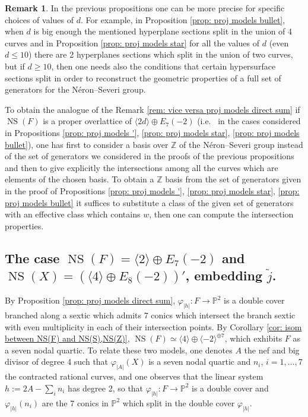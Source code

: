 \documentclass{amsart}
\theoremstyle{definition}
\newtheorem{rem}[thm]{Remark}
\numberwithin{equation}{section}
\numberwithin{equation}{section} \theoremstyle{definition}
\DeclareMathOperator{\NS}{NS}
\newcommand{\ra}{\rightarrow}
\newcommand\Z{\mathbb{Z}}
\begin{document}
\begin{rem}{\rm 
In the previous propositions one can be more precise for specific choices of values of $d$. For example, in Proposition \ref{prop: proj models bullet}, when $d$ is big enough the mentioned hyperplane sections split in the union of 4 curves and in Proposition \ref{prop: proj models star} for all the values of $d$ (even $d\leq 10$) there are 2 hyperplanes sections which split in the union of two curves, but if $d\geq 10$, then one needs also the conditions that certain hypersurface sections split in order to reconstruct the geometric properties of a full set of generators for the N\'eron--Severi group.

To obtain the analogue of the Remark \ref{rem: vice versa proj models direct sum} if $\NS(F)$ is a proper overlattice of $\langle 2d\rangle\oplus E_7(-2)$ (i.e.~ in the cases considered in Propositions \ref{prop: proj models '}, \ref{prop: proj models star}, \ref{prop: proj models bullet}), one has first to consider a basis over $\Z$ of the N\'eron--Severi group instead of the set of generators we considered in the proofs of the previous propositions and then to give explicitly the intersections among all the curves which are elements of the chosen basis. To obtain a $\Z$ basis from the set of generators given in the proof of Propositions \ref{prop: proj models '}, \ref{prop: proj models star}, \ref{prop: proj models bullet} it suffices to substitute a class of the given set of generators with an effective class which contains $w$, then one can compute the intersection properties.
}\end{rem}

\subsection{The case $\NS(F)=\langle 2\rangle\oplus E_7(-2)$ and $\NS(X)=(\langle 4\rangle\oplus E_8(-2))'$, embedding $\widetilde{j}$.}

By Proposition \ref{prop: proj models direct sum}, $\varphi_{|h|}:F\ra \mathbb{P}^2$ is a double cover branched along a sextic which admits 7 conics which intersect the branch sextic with even multiplicity in each of their intersection points.
By Corollary \ref{cor: isom between NS(F) and NS(S),NS(Z)}, $\NS(F)\simeq \langle 4\rangle\oplus \langle -2\rangle^{\oplus 7}$, which exhibits $F$ as a seven nodal quartic.
To relate these two models, one denotes $A$ the nef and big divisor of degree 4 such that $\varphi_{|A|}(X)$ is a seven nodal quartic and $n_i$, $i=1,\ldots, 7$ the contracted rational curves, and one observes that the linear system $h:=2A-\sum_in_i$ has degree 2, so that $\varphi_{|h|}:F\ra\mathbb{P}^2$ is a double cover and $\varphi_{|h|}(n_i)$ are the 7 conics in $\mathbb{P}^2$ which split in the double cover $\varphi_{|h|}$.
\end{document}
